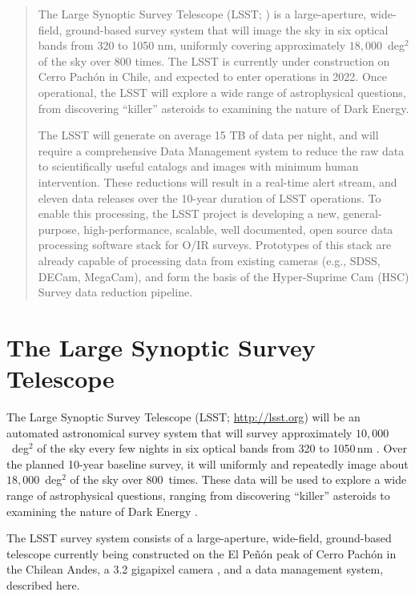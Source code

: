 \documentclass[11pt,twoside]{article}
\begin{document}
\clearpage

\begin{abstract}

The Large Synoptic Survey Telescope (LSST; \citealt{2008arXiv0805.2366I}) is a
large-aperture, wide-field, ground-based survey system that will image
the sky in six optical bands from 320 to 1050 nm, uniformly covering approximately
$18,000$~deg$^2$ of the sky over 800 times. The LSST is currently
under construction on Cerro Pach\'{o}n in Chile, and expected to enter operations
in 2022. Once operational, the LSST will explore a wide range of
astrophysical questions, from discovering ``killer'' asteroids
to examining the nature of Dark Energy.

The LSST will generate on average 15 TB of data per night,
and will require a comprehensive Data Management system to reduce the
raw data to scientifically useful catalogs and images with minimum human
intervention. These reductions will result in a real-time alert stream, and
eleven data releases over the 10-year duration of LSST operations.
To enable this processing, the LSST project is developing a new,
general-purpose, high-performance, scalable, well documented, open source
data processing software stack for O/IR surveys. Prototypes of this stack
are already capable of processing data from existing cameras (e.g., SDSS,
DECam, MegaCam), and form the basis of the Hyper-Suprime Cam (HSC) Survey
data reduction pipeline.

\end{abstract}

\vspace{-0.3in}
\section{ The Large Synoptic Survey Telescope }

The Large Synoptic Survey Telescope (LSST; \url{http://lsst.org}) will be an
automated astronomical survey system that will survey approximately
$10,000$~deg$^2$ of the sky every few nights in six optical bands from 320
to 1050\,nm \citep{2008arXiv0805.2366I, lsstSRD}. Over the planned 10-year baseline
survey, it will uniformly and repeatedly image about $18,000$~deg$^2$ of the sky
over $800$~times. These data will be used to explore
a wide range of astrophysical questions, ranging from discovering
``killer'' asteroids to examining the nature of Dark Energy
\citep[e.g., see][]{2009arXiv0912.0201L}.

The LSST survey system consists of a large-aperture, wide-field, ground-based telescope \citep{2014SPIE.9145E..1AG}
currently being constructed on the El Pe\~n\'{o}n peak of Cerro Pach\'{o}n in the Chilean
Andes, a 3.2 gigapixel camera \citep{2010SPIE.7735E..0JK}, and a data management
system, described here.
\end{document}
